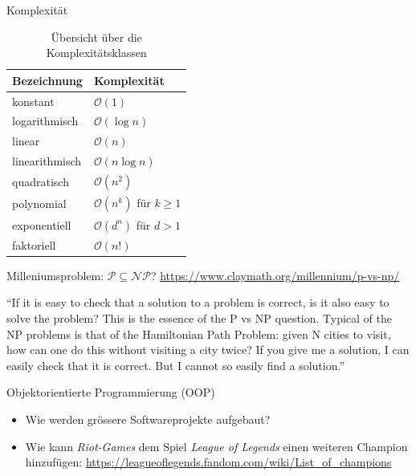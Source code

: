 \begin{frame}[fragile]{Komplexität}
	\begin{table}[ht]
		\centering
		\begin{tabular}{ll}
			\hline
			\textbf{Bezeichnung} & \textbf{Komplexität}                  \\ \hline
			konstant             & \(\mathcal{O}(1)\)                    \\
			logarithmisch        & \(\mathcal{O}(\log n)\)               \\
			linear               & \(\mathcal{O}(n)\)                    \\
			linearithmisch       & \(\mathcal{O}(n \log n)\)             \\
			quadratisch          & \(\mathcal{O}(n^2)\)                  \\
			polynomial           & \(\mathcal{O}(n^k)\) für \(k \geq 1\) \\
			exponentiell         & \(\mathcal{O}(d^n)\) für \(d > 1\)    \\
			faktoriell           & \(\mathcal{O}(n!)\)                   \\ \hline
		\end{tabular}
		\caption{Übersicht über die Komplexitätsklassen}
		\label{tab:komplexitaet}
	\end{table}
\end{frame}


\begin{frame}[fragile]{Milleniumsproblem: $\mathcal{P}\subseteq\mathcal{NP}$?}
	\url{https://www.claymath.org/millennium/p-vs-np/}
	\begin{center}
		\enquote{If it is easy to check that a solution to a problem is correct, is it also easy to solve the problem? This is the essence of the P vs NP question. Typical of the NP problems is that of the Hamiltonian Path Problem: given N cities to visit, how can one do this without visiting a city twice? If you give me a solution, I can easily check that it is correct. But I cannot so easily find a solution.}
	\end{center}
\end{frame}


\begin{frame}[fragile]{Objektorientierte Programmierung (OOP)}
	\begin{itemize}
		\item
		      Wie werden grössere Softwareprojekte aufgebaut?
		\item Wie kann \textit{Riot-Games} dem Spiel \textit{League of Legends} einen weiteren Champion hinzufügen: \url{https://leagueoflegends.fandom.com/wiki/List_of_champions}
	\end{itemize}
\end{frame}

